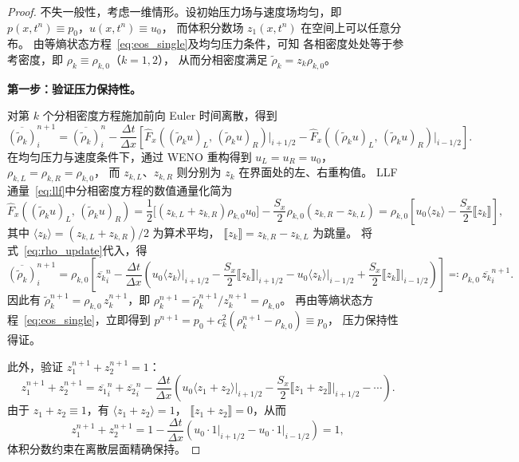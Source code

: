 \documentclass[12pt,a4paper]{article}
\newcommand{\avg}[1]{\langle #1 \rangle}
\newcommand{\jump}[1]{\llbracket #1 \rrbracket}
\numberwithin{equation}{section}    %
\begin{document}
\begin{proof}
不失一般性，考虑一维情形。设初始压力场与速度场均匀，即
$p(x, t^n) \equiv p_0$，$u(x, t^n) \equiv u_0$，
而体积分数场 $z_1(x, t^n)$ 在空间上可以任意分布。
由等熵状态方程~\eqref{eq:eos_single}及均匀压力条件，可知
各相密度处处等于参考密度，即 $\rho_k \equiv \rho_{k,0}$（$k = 1, 2$），
从而分相密度满足 $\tilde{\rho}_k = z_k \rho_{k,0}$。

\textbf{第一步：验证压力保持性。}

对第 $k$ 个分相密度方程施加前向 Euler 时间离散，得到
\begin{equation}
    \label{eq:rho_update}
    \overline{(\tilde{\rho}_k)}_{i}^{n+1}
    = \overline{(\tilde{\rho}_k)}_{i}^{n}
    - \frac{\Delta t}{\Delta x}
    \left[
        \hat{F}_x\!\left((\tilde{\rho}_k u)_L,\, (\tilde{\rho}_k u)_R\right)\big|_{i+1/2}
        -
        \hat{F}_x\!\left((\tilde{\rho}_k u)_L,\, (\tilde{\rho}_k u)_R\right)\big|_{i-1/2}
    \right].
\end{equation}
在均匀压力与速度条件下，通过 WENO 重构得到
$u_L = u_R = u_0$，$\rho_{k,L} = \rho_{k,R} = \rho_{k,0}$，
而 $z_{k,L}$、$z_{k,R}$ 则分别为 $z_k$ 在界面处的左、右重构值。
LLF 通量~\eqref{eq:llf}中分相密度方程的数值通量化简为
\begin{equation}
    \hat{F}_x\!\left((\tilde{\rho}_k u)_L,\, (\tilde{\rho}_k u)_R\right)
    = \frac{1}{2}\bigl[(z_{k,L} + z_{k,R})\rho_{k,0} u_0\bigr]
    - \frac{S_x}{2}\rho_{k,0}(z_{k,R} - z_{k,L})
    = \rho_{k,0}
    \left[
        u_0 \avg{z_k} - \frac{S_x}{2}\jump{z_k}
    \right],
\end{equation}
其中 $\avg{z_k} = (z_{k,L} + z_{k,R})/2$ 为算术平均，
$\jump{z_k} = z_{k,R} - z_{k,L}$ 为跳量。
将式~\eqref{eq:rho_update}代入，得
\begin{equation}
    \overline{(\tilde{\rho}_k)}_{i}^{n+1}
    = \rho_{k,0}
    \left[
        \overline{z_k}_{i}^{n}
        - \frac{\Delta t}{\Delta x}
        \left(
        u_0 \avg{z_k}\big|_{i+1/2} - \frac{S_x}{2}\jump{z_k}\big|_{i+1/2}
        - u_0 \avg{z_k}\big|_{i-1/2} + \frac{S_x}{2}\jump{z_k}\big|_{i-1/2}
        \right)
    \right]
    \eqqcolon \rho_{k,0}\, \overline{z_k}_{i}^{n+1}.
\end{equation}
因此有 $\tilde{\rho}_k^{n+1} = \rho_{k,0}\, z_k^{n+1}$，即
$\rho_k^{n+1} = \tilde{\rho}_k^{n+1} / z_k^{n+1} = \rho_{k,0}$。
再由等熵状态方程~\eqref{eq:eos_single}，立即得到
$p^{n+1} = p_0 + c_k^2(\rho_k^{n+1} - \rho_{k,0}) \equiv p_0$，
压力保持性得证。

此外，验证 $z_1^{n+1} + z_2^{n+1} = 1$：
\begin{equation}
    z_1^{n+1} + z_2^{n+1}
    = \overline{z_1}_i^n + \overline{z_2}_i^n
    - \frac{\Delta t}{\Delta x}
    \left(
        u_0 \avg{z_1 + z_2}\big|_{i+1/2} - \frac{S_x}{2}\jump{z_1+z_2}\big|_{i+1/2}
        - \cdots
    \right).
\end{equation}
由于 $z_1 + z_2 \equiv 1$，有 $\avg{z_1+z_2} = 1$，
$\jump{z_1+z_2} = 0$，从而
\begin{equation}
    z_1^{n+1} + z_2^{n+1}
    = 1 - \frac{\Delta t}{\Delta x}
    \left(
        u_0 \cdot 1\big|_{i+1/2} - u_0 \cdot 1\big|_{i-1/2}
    \right)
    = 1,
\end{equation}
体积分数约束在离散层面精确保持。


\end{proof}
\end{document}

